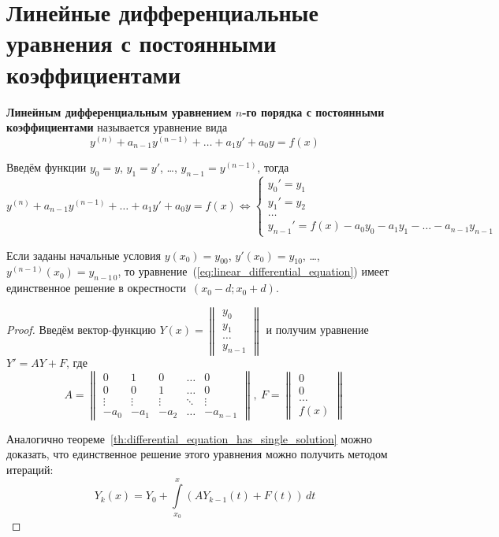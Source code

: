 \section{Линейные дифференциальные уравнения с постоянными коэффициентами}
 \textbf{Линейным дифференциальным уравнением $n$-го порядка с постоянными коэффициентами} называется уравнение вида
\begin{equation}
\label{eq:linear_differential_equation}
y^{(n)} + a_{n-1} y^{(n-1)} + \ldots + a_1 y' + a_0 y = f(x)
\end{equation}

Введём функции $y_0 = y$, $y_1 = y'$, \ldots, $y_{n-1} = y^{(n-1)}$, тогда
\begin{equation*}
y^{(n)} + a_{n-1} y^{(n-1)} + \ldots + a_1 y' + a_0 y = f(x) \Leftrightarrow
\begin{cases}
y_0' = y_1 \\
y_1' = y_2 \\
\ldots \\
y_{n-1}' = f(x) - a_0 y_0 - a_1 y_1 - \ldots - a_{n-1} y_{n-1}
\end{cases}
\end{equation*}

\begin{theorem}
Если заданы начальные условия $y(x_0) = y_{00}$, $y'(x_0) = y_{10}$, \ldots, $y^{(n-1)}(x_0) = y_{n-1\,0}$, то уравнение~(\ref*{eq:linear_differential_equation}) имеет единственное решение в окрестности~$(x_0 - d; x_0 + d)$.
\end{theorem}
\begin{proof}
Введём вектор-функцию $Y(x) =
\begin{Vmatrix}
y_0 \\
y_1 \\
\ldots \\
y_{n-1}
\end{Vmatrix}$
и получим уравнение $Y' = A Y + F$, где
\begin{equation*}
A =
\begin{Vmatrix}
0 & 1 & 0 & \ldots & 0 \\
0 & 0 & 1 & \ldots & 0 \\
\vdots & \vdots & \vdots & \ddots & \vdots \\
-a_0 & -a_1 & -a_2 & \ldots & -a_{n-1}
\end{Vmatrix}, \
F =
\begin{Vmatrix}
0 \\
0 \\
\ldots \\
f(x)
\end{Vmatrix}
\end{equation*}

Аналогично теореме~\ref{th:differential_equation_has_single_solution} можно доказать, что единственное решение этого уравнения можно получить методом итераций:
\begin{equation*}
Y_k(x) = Y_0 + \int\limits_{x_0}^x (A Y_{k-1}(t) + F(t))\,dt
\end{equation*}
\end{proof}

